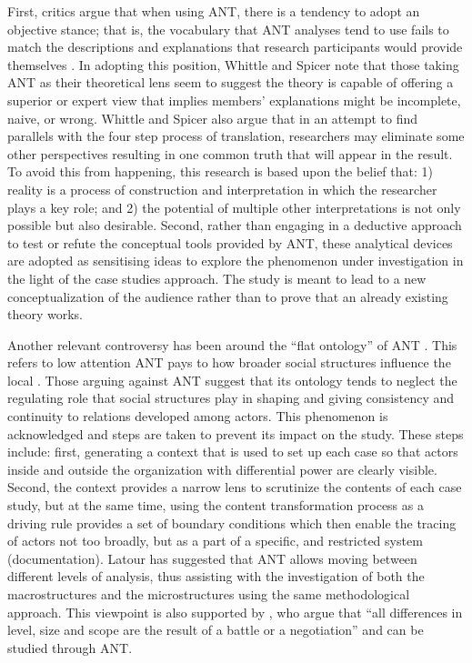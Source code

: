 First, critics argue that when using ANT, there is a tendency to adopt an objective stance; that is, the vocabulary that ANT analyses tend to use fails to match the descriptions and explanations that research participants would provide themselves \cite{murdoch2001ecologising}. In adopting this position, Whittle and Spicer \cite{whittle2008actor} note that those taking ANT as their theoretical lens seem to suggest the theory is capable of offering a superior or expert view that implies members’ explanations might be incomplete, naive, or wrong. Whittle and Spicer \cite{whittle2008actor} also argue that in an attempt to find parallels with the four step process of translation, researchers may eliminate some other perspectives resulting in one common truth that will appear in the result. To avoid this from happening, this research is based upon the belief that: 1) reality is a process of construction and interpretation in which the researcher plays a key role; and 2) the potential of multiple other interpretations is not only possible but also desirable. Second, rather than engaging in a deductive approach to test or refute the conceptual tools provided by ANT, these analytical devices are adopted as sensitising ideas to explore the phenomenon under investigation in the light of the case studies approach. The study is meant to lead to a new conceptualization of the audience rather than to prove that an already existing theory works.

Another relevant controversy has been around the “flat ontology” of ANT \cite{whittle2008actor}. This refers to low attention ANT pays to how broader social structures influence the local \cite{walsham1997actor}. Those arguing against ANT suggest that its ontology tends to neglect the regulating role that social structures play in shaping and giving consistency and continuity to relations developed among actors. This phenomenon is acknowledged and steps are taken to prevent its impact on the study. These steps include: first, generating a context that is used to set up each case so that actors inside and outside the organization with differential power are clearly visible. Second, the context provides a narrow lens to scrutinize the contents of each case study, but at the same time, using the content transformation process as a driving rule provides a set of boundary conditions which then enable the tracing of actors not too broadly, but as a part of a specific, and restricted system (documentation). Latour has suggested that ANT allows moving between different levels of analysis, thus assisting with the investigation of both the macrostructures and the microstructures using the same methodological approach. This viewpoint is also supported by \textcite{callon1981unscrewing}, who argue that “all differences in level, size and scope are the result of a battle or a negotiation” and can be studied through ANT.

